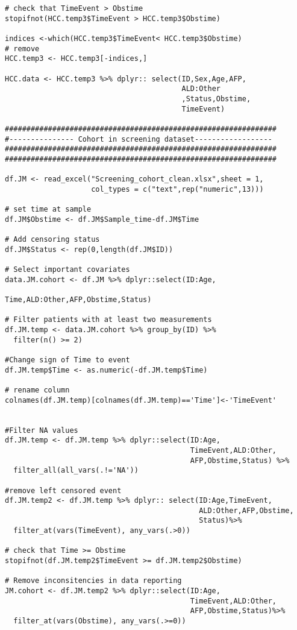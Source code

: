 \documentclass[11pt,twoside]{article}
\numberwithin{Theorem}{section}
\numberwithin{Definition}{section}
\numberwithin{Lemma}{section}
\numberwithin{Algorithm}{section}
\numberwithin{equation}{section}
\begin{document}
\begin{lstlisting}
# check that TimeEvent > Obstime
stopifnot(HCC.temp3$TimeEvent > HCC.temp3$Obstime)

indices <-which(HCC.temp3$TimeEvent< HCC.temp3$Obstime)
# remove
HCC.temp3 <- HCC.temp3[-indices,]

HCC.data <- HCC.temp3 %>% dplyr:: select(ID,Sex,Age,AFP,
                                         ALD:Other
                                         ,Status,Obstime,
                                         TimeEvent)

###############################################################
#--------------- Cohort in screening dataset------------------
###############################################################
###############################################################

df.JM <- read_excel("Screening_cohort_clean.xlsx",sheet = 1,
                    col_types = c("text",rep("numeric",13)))

# set time at sample
df.JM$Obstime <- df.JM$Sample_time-df.JM$Time

# Add censoring status
df.JM$Status <- rep(0,length(df.JM$ID))

# Select important covariates
data.JM.cohort <- df.JM %>% dplyr::select(ID:Age,
                                          Time,ALD:Other,AFP,Obstime,Status)

# Filter patients with at least two measurements
df.JM.temp <- data.JM.cohort %>% group_by(ID) %>%
  filter(n() >= 2)

#Change sign of Time to event
df.JM.temp$Time <- as.numeric(-df.JM.temp$Time)

# rename column
colnames(df.JM.temp)[colnames(df.JM.temp)=='Time']<-'TimeEvent'


#Filter NA values
df.JM.temp <- df.JM.temp %>% dplyr::select(ID:Age,
                                           TimeEvent,ALD:Other,
                                           AFP,Obstime,Status) %>%
  filter_all(all_vars(.!='NA'))

#remove left censored event
df.JM.temp2 <- df.JM.temp %>% dplyr:: select(ID:Age,TimeEvent,
                                             ALD:Other,AFP,Obstime,
                                             Status)%>%
  filter_at(vars(TimeEvent), any_vars(.>0))

# check that Time >= Obstime
stopifnot(df.JM.temp2$TimeEvent >= df.JM.temp2$Obstime)

# Remove inconsitencies in data reporting
JM.cohort <- df.JM.temp2 %>% dplyr::select(ID:Age,
                                           TimeEvent,ALD:Other,
                                           AFP,Obstime,Status)%>%
  filter_at(vars(Obstime), any_vars(.>=0))


\end{lstlisting}
\end{document}
